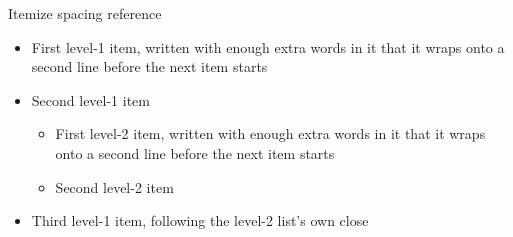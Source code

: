 
\begin{standardframe}{Itemize spacing reference}
	\vspace*{-13pt}
	\begin{itemize}
		\item First level-1 item, written with enough extra words in it that it wraps onto a second line before the next item starts
		\item Second level-1 item
		\begin{itemize}
			\item First level-2 item, written with enough extra words in it that it wraps onto a second line before the next item starts
			\item Second level-2 item
		\end{itemize}
		\item Third level-1 item, following the level-2 list's own close
	\end{itemize}
\end{standardframe}
